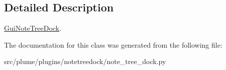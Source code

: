 \subsection{Detailed Description}
\hyperlink{classplume-creator_1_1src_1_1plume_1_1plugins_1_1notetreedock_1_1note__tree__dock_1_1_gui_note_tree_dock}{Gui\+Note\+Tree\+Dock}. 

The documentation for this class was generated from the following file\+:\begin{DoxyCompactItemize}
\item 
src/plume/plugins/notetreedock/note\+\_\+tree\+\_\+dock.\+py\end{DoxyCompactItemize}
